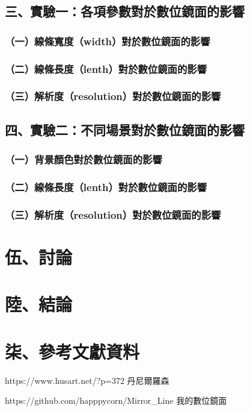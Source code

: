 \documentclass[12pt]{article}
\begin{document}
\subsection{三、實驗一：各項參數對於數位鏡面的影響}

\subsubsection{（一）線條寬度（width）對於數位鏡面的影響}

\subsubsection{（二）線條長度（lenth）對於數位鏡面的影響}

\subsubsection{（三）解析度（resolution）對於數位鏡面的影響}

\subsection{四、實驗二：不同場景對於數位鏡面的影響}

\subsubsection{（一）背景顏色對於數位鏡面的影響}

\subsubsection{（二）線條長度（lenth）對於數位鏡面的影響}

\subsubsection{（三）解析度（resolution）對於數位鏡面的影響}

\newpage
\section{伍、討論}

\newpage
\section{陸、結論}

\newpage
\section{柒、參考文獻資料}

https://www.husart.net/?p=372 丹尼爾羅森

https://github.com/happpycorn/Mirror_Line 我的數位鏡面
\end{document}
